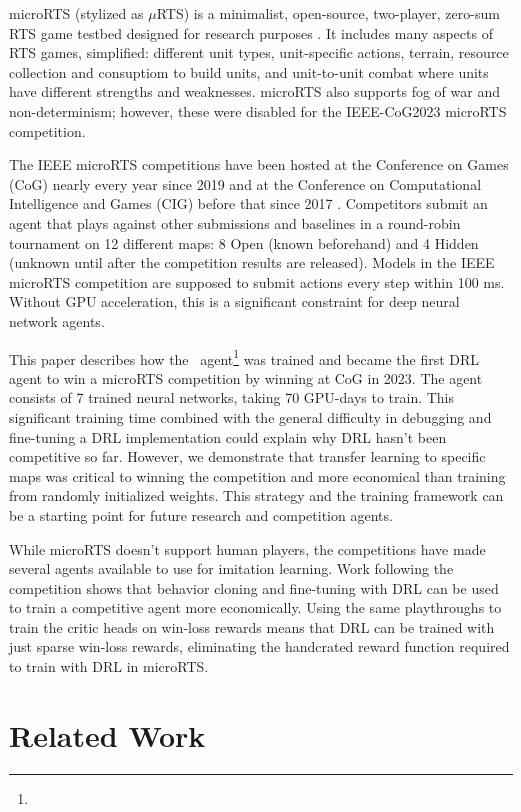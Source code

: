 \documentclass{article}
\begin{document}
microRTS (stylized as $\mu$RTS) is a minimalist, open-source, two-player, zero-sum RTS game testbed designed for research
purposes \citep{Ontan2013TheCM}. It includes many aspects of RTS games, simplified: different unit types, unit-specific
actions, terrain, resource collection and consuptiom to build units, and unit-to-unit combat
where units have different strengths and weaknesses. microRTS also supports fog of war
and non-determinism; however, these were disabled for the IEEE-CoG2023 microRTS
competition.

The IEEE microRTS competitions have been hosted at the Conference on Games (CoG) nearly
every year since 2019 and at the Conference on Computational Intelligence and Games
(CIG) before that since 2017 \citep{Ontañón_Barriga_Silva_Moraes_Lelis_2018}.
Competitors submit an agent that plays against other submissions and baselines in a round-robin tournament
on 12 different maps: 8 Open (known beforehand) and 4 Hidden (unknown until after the
competition results are released). Models in the IEEE microRTS competition are supposed
to submit actions every step within 100 ms. Without GPU acceleration, this is a significant constraint for deep neural
network agents.

This paper describes how the \agentName\ agent\footnote{\raiMicroRTSGitHubUrl} was
trained and became the first DRL agent to win a microRTS competition by winning at CoG
in 2023. The agent consists of 7 trained neural networks, taking 70
GPU-days to train. This significant training time combined with the general difficulty
in debugging and fine-tuning a DRL implementation could explain why DRL hasn't been
competitive so far. However, we demonstrate that transfer learning to specific maps was
critical to winning the competition and more economical than training from randomly
initialized weights. This strategy and the training framework can be a starting
point for future research and competition agents.

While microRTS doesn't support human players, the competitions have made several agents
available to use for imitation learning. Work following the
competition shows that behavior cloning and fine-tuning with DRL can be used to train a
competitive agent more economically. Using the same playthroughs to train the critic
heads on win-loss rewards means that DRL can be trained with just sparse win-loss
rewards, eliminating the handcrated reward function required to train with DRL in microRTS.

\section{Related Work}
\end{document}
